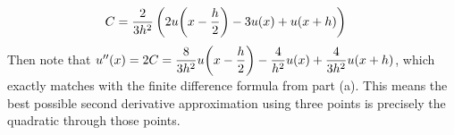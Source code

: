 \documentclass{article} %
\theoremstyle{plain}
\numberwithin{equation}{section} %
\numberwithin{figure}{section} %
\numberwithin{table}{section} %
\begin{document}
\begin{enumerate}[\ \ (a)]
\begin{align}
            C &= \frac{2}{3 h^{2}} \left(2 u\qty(x - \frac{h}{2}) - 3 u(x) + u\qty(x + h)\right)
        \end{align}
        Then note that $u''(x) = 2C = \dfrac{8}{3h^2}u\qty(x - \dfrac{h}{2}) - \dfrac{4}{h^2}u(x) + \dfrac{4}{3h^2}u\qty(x + h)$, which exactly matches with the finite difference formula from part (a).  This means the best possible second derivative approximation using three points is precisely the quadratic through those points.
\end{enumerate}
\end{document}
